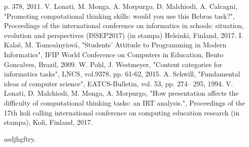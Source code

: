 \documentclass[12pt]{report}
\begin{document}
\begin{thebibliography}{00}
p. 378, 
2011.
%
V. Lonati, M. Monga, A. Morpurgo, D. Malchiodi, A. Calcagni, 
"Promoting computational thinking skills: would you use this Bebras task?", 
Proceedings of the international conference on informatics in schools: situation, evolution and perspectives (ISSEP2017) (in stampa) 
Helsinki, Finland, 
2017.
%
I. Kalaš, M. Tomcsányiová, 
"Students’ Attitude to Programming in Modern Informatics", 
IFIP World Conference on Computers in Education, 
Bento Goncalves, Brazil, 
2009.
%
W. Pohl, J. Westmeyer, 
"Content categories for informatics tasks", 
LNCS, vol.9378, 
pp. 61-62,
2015. 
%
A. Schwill, 
"Fundamental ideas of computer science", 
EATCS-Bulletin, vol. 53, 
pp. 274– 295, 
1994.
%
V. Lonati, D. Malchiodi, M. Monga, A. Morpurgo, 
"How presentation affects the difficulty of computational thinking tasks: an IRT analysis.", 
Proceedings of the 17th koli calling international conference on computing education research (in stampa),
Koli, Finland, 
2017.
%
\end{thebibliography}
% 
%
asdjhgftry.
\end{document}
